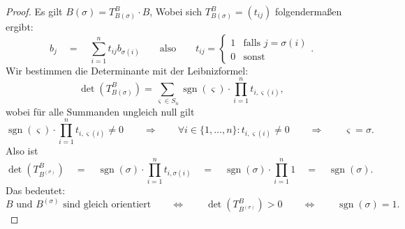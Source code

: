 \documentclass{article}
\newcommand{\imp}{\mathbb{\Rightarrow}}
\newcommand{\equ}{\mathbb{\Leftrightarrow}}
\newcommand{\eq}{\mathbb{\quad = \quad}}
\DeclareMathOperator{\sgn}{sgn}
\begin{document}
\begin{proof}
 Es gilt
 $B(\sigma) = T^B_{B(\sigma)} \cdot B$,
 Wobei sich
 $T^B_{B(\sigma)} = (t_{ij})$
 folgendermaßen ergibt:
 \[
  b_j \eq \sum_{i=1}^{n} t_{ij} b_{\sigma(i)}
  \qquad\text{also}\qquad
  t_{ij} = \begin{cases*}
    1 & \text{falls $j = \sigma(i)$} \\
    0 & \text{sonst}
   \end{cases*}.
 \]
Wir bestimmen die Determinante mit der Leibnizformel:
 \[
 \det(T^B_{B(\sigma)})
 =
 \sum_{\varsigma \in S_n} \sgn(\varsigma) \cdot \prod_{i = 1}^{n} t_{i,\varsigma(i)},
 \]
 wobei für alle Summanden ungleich null gilt
 \[
  \sgn(\varsigma) \cdot \prod_{i = 1}^{n} t_{i,\varsigma(i)} \neq 0
 \qquad\imp\qquad
 \forall i \in \{1, \ldots, n\} : t_{i, \varsigma(i)} \neq 0
 \qquad\imp\qquad
 \varsigma = \sigma.
 \]
 Also ist
 \[
 \det(T^B_{B^{(\sigma)}})
 \eq
 \sgn(\sigma) \cdot \prod_{i = 1}^{n} t_{i,\sigma(i)}
 \eq 
 \sgn(\sigma) \cdot \prod_{i = 1}^{n} 1
 \eq
 \sgn(\sigma).\]
 Das bedeutet:
 \[
 \text{$B$ und $B^{(\sigma)}$ sind gleich orientiert}
 \qquad\equ\qquad
 \det(T^B_{B^{(\sigma)}}) > 0
 \qquad\equ\qquad
 \sgn(\sigma) = 1.
 \]
\end{proof}
\end{document}
